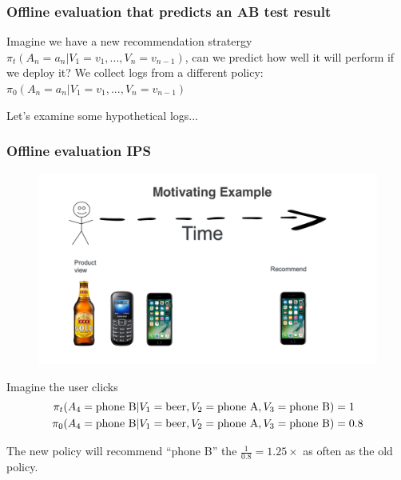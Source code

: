 \begin{frame}
  \frametitle{Offline evaluation that predicts an AB test result}

Imagine we have a new recommendation stratergy $\pi_t(A_{n}=a_n|V_1=v_1,...,V_n=v_{n-1})$, can we
predict how well it will perform if we deploy it?  We collect logs
from a different policy: $\pi_0(A_{n}=a_n|V_1=v_1,...,V_n=v_{n-1})$

\pause

Let's examine some hypothetical logs... 

 \end{frame}



\begin{frame}
  \frametitle{Offline evaluation IPS}
 
 
   \begin{figure}[h!]
     \includegraphics[scale=0.15]{images/mot_ex2.png}
       \centering
       \label{motex1}
   \end{figure}

Imagine the user clicks
\begin{align*}
     \pi_t(A_{4}= {\rm phone ~ B} {\rm }|V_1={\rm beer}, V_2={\rm phone ~ A}, V_3={\rm phone ~ B}) &= 1\\
     \pi_0(A_{4}= {\rm phone ~ B} {\rm }|V_1={\rm beer}, V_2={\rm phone ~ A}, V_3={\rm phone ~ B}) &= 0.8\\
\end{align*}

The new policy will recommend ``phone B'' the $\frac{1}{0.8}=1.25 \times$ as often as the old policy.
   
 \end{frame}




